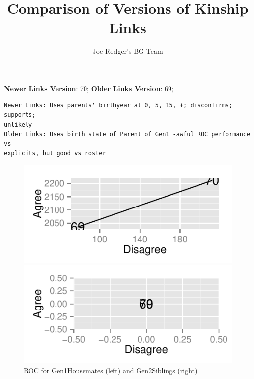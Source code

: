 \documentclass[a4paper]{article}\usepackage{graphicx, color}
\title{Comparison of Versions of Kinship Links}
\author{Joe Rodger's BG Team}
\makeatletter
\def\maxwidth{ %
  \ifdim\Gin@nat@width>\linewidth
    \linewidth
  \else
    \Gin@nat@width
  \fi
}
\newenvironment{kframe}{%
 \def\at@end@of@kframe{}%
 \ifinner\ifhmode%
  \def\at@end@of@kframe{\end{minipage}}%
  \begin{minipage}{\columnwidth}%
 \fi\fi%
 \def\FrameCommand##1{\hskip\@totalleftmargin \hskip-\fboxsep
 \colorbox{shadecolor}{##1}\hskip-\fboxsep
     \hskip-\linewidth \hskip-\@totalleftmargin \hskip\columnwidth}%
 \MakeFramed {\advance\hsize-\width
   \@totalleftmargin\z@ \linewidth\hsize
   \@setminipage}}%
 {\par\unskip\endMakeFramed%
 \at@end@of@kframe}
\newenvironment{knitrout}{}{} %
\makeatother
\begin{document}
\maketitle

\setlength{\parindent}{0pt}%







\textbf{Newer Links Version}: 70;
\textbf{Older Links Version}: 69;

\begin{knitrout}
\color{fgcolor}\begin{kframe}
\begin{verbatim}
Newer Links: Uses parents' birthyear at 0, 5, 15, +; disconfirms; supports;
unlikely
Older Links: Uses birth state of Parent of Gen1 -awful ROC performance vs
explicits, but good vs roster
\end{verbatim}
\end{kframe}
\end{knitrout}


\begin{figure}[htbp]
\begin{knitrout}
\color{fgcolor}
\includegraphics[width=\maxwidth]{figure/unnamed-chunk-31} 

\includegraphics[width=\maxwidth]{figure/unnamed-chunk-32} 

\end{knitrout}

\caption{ROC for Gen1Housemates (left) and Gen2Siblings (right)}
\end{figure}
\end{document}
